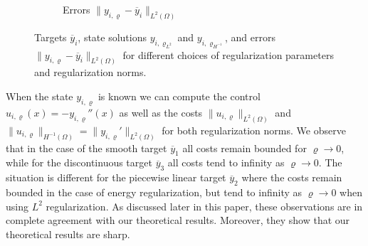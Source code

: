 \documentclass{article}
\numberwithin{equation}{section}
\begin{document}
\begin{figure}[h]
\begin{subfigure}[t]{0.48\textwidth}

    \caption{Errors $\|y_{i,\varrho}-\overline{y}_i\|_{L^2(\Omega)}$}
  \end{subfigure}
  \caption{Targets $\overline{y}_i$, state solutions $y_{i,\varrho_{L^2}}$
    and $y_{i,\varrho_{H^{-1}}}$, and errors
    $\| y_{i,\varrho} - \overline{y}_i \|_{L^2(\Omega)}$
    for different choices of regularization
    parameters and regularization norms.}
  \label{Fig:Introduction:states-1D}
\end{figure}

When the state $y_{i,\varrho}$ is known we can compute the control
$u_{i,\varrho}(x) = - y_{i,\varrho}''(x)$ as well as the costs
$\| u_{i,\varrho} \|_{L^2(\Omega)}$ 
and $\| u_{i,\varrho} \|_{H^{-1}(\Omega)} = \| y_{i,\varrho}' \|_{L^2(\Omega)}$
for both regularization norms. We observe that in the case of the smooth
target $\overline{y}_1$ all costs remain bounded for $\varrho \to 0$,
while for the discontinuous target $\overline{y}_3$ all costs tend
to infinity as $\varrho \to 0$. The situation is different for the
piecewise linear target $\overline{y}_2$ where the costs remain bounded
in the case of energy regularization, but tend to infinity as $\varrho \to 0$
when using $L^2$ regularization. As discussed later in this paper, these
observations are in complete agreement with our theoretical results.
Moreover, they show that our theoretical results are sharp.
\end{document}
